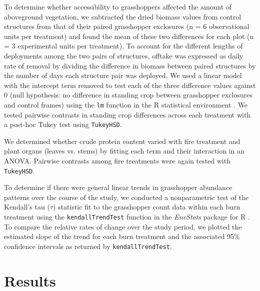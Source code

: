 \documentclass[referee, 
	            sn-basic]
           {sn-jnl}
\begin{document}
\begin{linenumbers}
To determine whether accessibility to grasshoppers affected the amount of aboveground vegetation, we subtracted the dried biomass values from control structures from that of their paired grasshopper exclosures (n = 6 observational units per treatment) and found the mean of these two differences for each plot (n = 3 experimental units per treatment). 
To account for the different lengths of deployments among the two pairs of structures, offtake was expressed as daily rate of removal by dividing the difference in biomass between paired structures by the number of days each structure pair was deployed.  
We used a linear model with the intercept term removed to test each of the three difference values against 0 (null hypothesis: no difference in standing crop between grasshopper exclosures and control frames) using the \texttt{lm} function in the \textsf{R} statistical environment \citep{Rcore2020}. 
We tested pairwise contrasts in standing crop differences across each treatment with a post-hoc Tukey test using \texttt{TukeyHSD}.

We determined whether crude protein content varied with fire treatment and plant organs (leaves vs. stems) by fitting each term and their interaction in an ANOVA.
Pairwise contrasts among fire treatments were again tested with \texttt{TukeyHSD}.

To determine if there were general linear trends in grasshopper abundance patterns over the course of the study, we conducted a nonparametric test of the Kendall's tau (\(\tau\)) statistic fit to the grasshopper count data within each burn treatment using the \texttt{kendallTrendTest} function in the \emph{EnvStats} package for
\textsf{R} \citep{millard2013}.
To compare the relative rates of change over the study period, we plotted the estimated slope of the trend for each burn treatment and the associated 95\% confidence intervals as returned by \texttt{kendallTrendTest}.

\section{Results}


\end{linenumbers}
\end{document}
